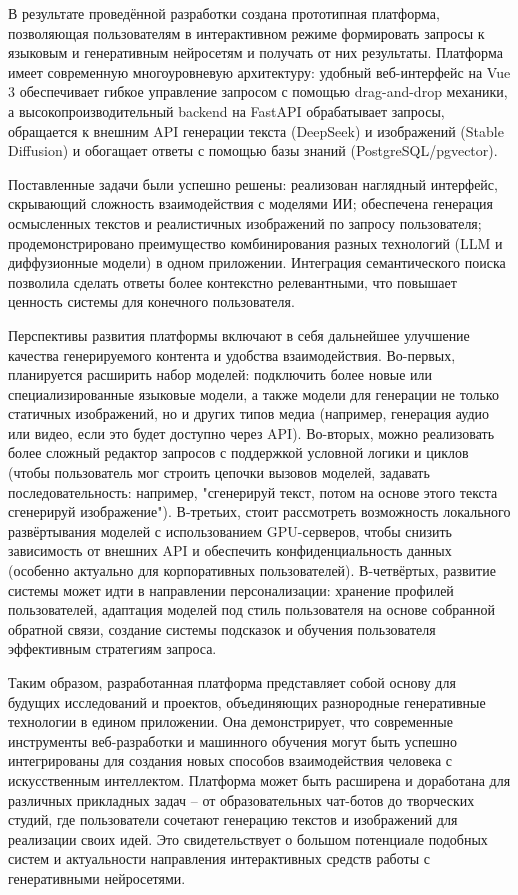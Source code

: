 В результате проведённой разработки создана прототипная платформа, позволяющая пользователям в интерактивном режиме формировать запросы к языковым и генеративным нейросетям и получать от них результаты. Платформа имеет современную многоуровневую архитектуру: удобный веб-интерфейс на Vue 3 обеспечивает гибкое управление запросом с помощью drag-and-drop механики, а высокопроизводительный backend на FastAPI обрабатывает запросы, обращается к внешним API генерации текста (DeepSeek) и изображений (Stable Diffusion) и обогащает ответы с помощью базы знаний (PostgreSQL/pgvector).

Поставленные задачи были успешно решены: реализован наглядный интерфейс, скрывающий сложность взаимодействия с моделями ИИ; обеспечена генерация осмысленных текстов и реалистичных изображений по запросу пользователя; продемонстрировано преимущество комбинирования разных технологий (LLM и диффузионные модели) в одном приложении. Интеграция семантического поиска позволила сделать ответы более контекстно релевантными, что повышает ценность системы для конечного пользователя.

Перспективы развития платформы включают в себя дальнейшее улучшение качества генерируемого контента и удобства взаимодействия. Во-первых, планируется расширить набор моделей: подключить более новые или специализированные языковые модели, а также модели для генерации не только статичных изображений, но и других типов медиа (например, генерация аудио или видео, если это будет доступно через API). Во-вторых, можно реализовать более сложный редактор запросов с поддержкой условной логики и циклов (чтобы пользователь мог строить цепочки вызовов моделей, задавать последовательность: например, "сгенерируй текст, потом на основе этого текста сгенерируй изображение"). В-третьих, стоит рассмотреть возможность локального развёртывания моделей с использованием GPU-серверов, чтобы снизить зависимость от внешних API и обеспечить конфиденциальность данных (особенно актуально для корпоративных пользователей). В-четвёртых, развитие системы может идти в направлении персонализации: хранение профилей пользователей, адаптация моделей под стиль пользователя на основе собранной обратной связи, создание системы подсказок и обучения пользователя эффективным стратегиям запроса.

Таким образом, разработанная платформа представляет собой основу для будущих исследований и проектов, объединяющих разнородные генеративные технологии в едином приложении. Она демонстрирует, что современные инструменты веб-разработки и машинного обучения могут быть успешно интегрированы для создания новых способов взаимодействия человека с искусственным интеллектом. Платформа может быть расширена и доработана для различных прикладных задач -- от образовательных чат-ботов до творческих студий, где пользователи сочетают генерацию текстов и изображений для реализации своих идей. Это свидетельствует о большом потенциале подобных систем и актуальности направления интерактивных средств работы с генеративными нейросетями.